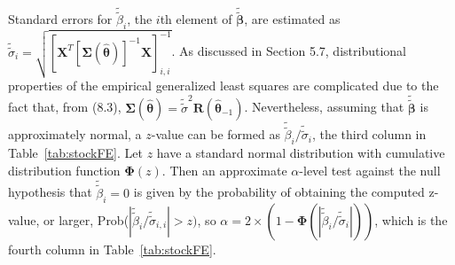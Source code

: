 \documentclass[12pt, titlepage]{article}
\begin{document}
Standard errors for $\tilde{\tilde{\beta}}_{i}$, the $i$th element of $\tilde{\tilde{\boldsymbol{\beta}}}$, are estimated as  $\tilde{\tilde{\sigma}}_{i} = \sqrt{[\mathbf{X}^{T}[\boldsymbol{\Sigma}(\hat{\boldsymbol{\theta}})]^{-1}\mathbf{X}]^{-1}_{i,i}}$.  As discussed in Section 5.7, distributional properties of the empirical generalized least squares are complicated due to the fact that, from (8.3), $\boldsymbol{\Sigma}(\hat{\boldsymbol{\theta}}) = \tilde{\tilde{\sigma}}^{2}\mathbf{R}(\hat{\boldsymbol{\theta}}_{-1})$.  Nevertheless, assuming that $\tilde{\tilde{\boldsymbol{\beta}}}$ is approximately normal, a $z$-value can be formed as $\tilde{\tilde{\beta}}_{i}/\tilde{\tilde{\sigma}}_{i}$, the third column in Table~\ref{tab:stockFE}. Let $z$ have a standard normal distribution with cumulative distribution function $\boldsymbol{\Phi}(z)$. Then an approximate $\alpha$-level test against the null hypothesis that $\tilde{\tilde{\beta}}_{i} = 0$ is given by the probability of obtaining the computed z-value, or larger, Prob($|\tilde{\tilde{\beta}}_{i}/\tilde{\tilde{\sigma}}_{i,i}| > z)$, so $\alpha = 2\times(1 - \boldsymbol{\Phi}(|\tilde{\tilde{\beta}}_{i}/\tilde{\tilde{\sigma}}_{i}|))$, which is the fourth column in Table~\ref{tab:stockFE}.
\end{document}
